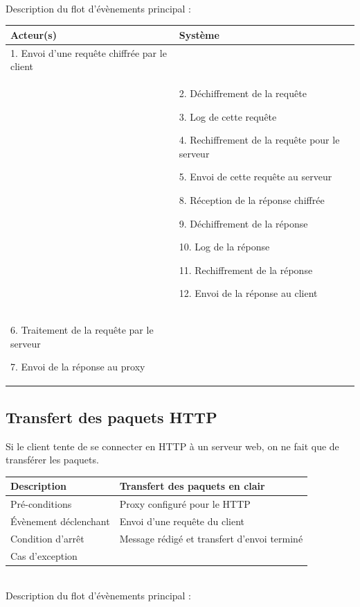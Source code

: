 \documentclass[a4paper,11pt,french]{article}
\begin{document}
~\\

Description du flot d'évènements principal :

\begin{tabular}{|m{8cm}|m{8cm}|}
   \hline
  \rowcolor[gray]{.8} Acteur(s) & Système \\
   \hline
   1. Envoi d'une requête chiffrée par le client & \\
   \hline
    &
2. Déchiffrement de la requête

3. Log de cette requête

4. Rechiffrement de la requête pour le serveur

5. Envoi de cette requête au serveur


8. Réception de la réponse chiffrée

9. Déchiffrement de la réponse

10. Log de la réponse

11. Rechiffrement de la réponse

12. Envoi de la réponse au client \\
   \hline
  6. Traitement de la requête par le serveur
  
7. Envoi de la réponse au proxy  &  \\
   \hline
\end{tabular}

\subsection{Transfert des paquets HTTP}

Si le client tente de se connecter en HTTP à un serveur web, on ne fait que de transférer les paquets.

\begin{tabular}{|>{\columncolor[gray]{.8}}m{4cm}|m{12cm}|}
   \hline
   Description & Transfert des paquets en clair \\
   \hline
   Pré-conditions & Proxy configuré pour le HTTP\\
   \hline
   Évènement déclenchant &  Envoi d'une requête du client\\
   \hline
   Condition d'arrêt & Message rédigé et transfert d’envoi terminé \\
   \hline
   Cas d'exception  & \\
   \hline   
\end{tabular}

~\\

Description du flot d'évènements principal :
\end{document}
